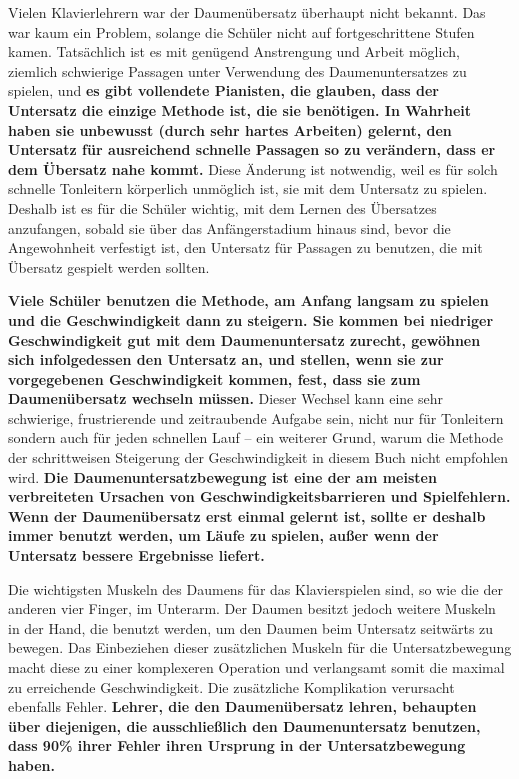 Vielen Klavierlehrern war der Daumenübersatz überhaupt nicht bekannt.
Das war kaum ein Problem, solange die Schüler nicht auf fortgeschrittene Stufen kamen.
Tatsächlich ist es mit genügend Anstrengung und Arbeit möglich, ziemlich schwierige Passagen unter Verwendung des Daumenuntersatzes zu spielen, und \textbf{es gibt vollendete Pianisten, die glauben, dass der Untersatz die einzige Methode ist, die sie benötigen.
In Wahrheit haben sie unbewusst (durch sehr hartes Arbeiten) gelernt, den Untersatz für ausreichend schnelle Passagen so zu verändern, dass er  dem Übersatz nahe kommt.}
Diese Änderung ist notwendig, weil es für solch schnelle Tonleitern körperlich unmöglich ist, sie mit dem Untersatz zu spielen.
Deshalb ist es für die Schüler wichtig, mit dem Lernen des Übersatzes anzufangen, sobald sie über das Anfängerstadium hinaus sind, bevor die Angewohnheit verfestigt ist, den Untersatz für Passagen zu benutzen, die mit Übersatz gespielt werden sollten.

\textbf{Viele Schüler benutzen die Methode, am Anfang langsam zu spielen und die Geschwindigkeit dann zu steigern.
Sie kommen bei niedriger Geschwindigkeit gut mit dem Daumenuntersatz zurecht, gewöhnen sich infolgedessen den Untersatz an, und stellen, wenn sie zur vorgegebenen Geschwindigkeit kommen, fest, dass sie zum Daumenübersatz wechseln müssen.}
Dieser Wechsel kann eine sehr schwierige, frustrierende und zeitraubende Aufgabe sein, nicht nur für Tonleitern sondern auch für jeden schnellen Lauf -- ein weiterer Grund, warum die Methode der schrittweisen Steigerung der Geschwindigkeit in diesem Buch nicht empfohlen wird.
\textbf{Die Daumenuntersatzbewegung ist eine der am meisten verbreiteten Ursachen von Geschwindigkeitsbarrieren und Spielfehlern.
Wenn der Daumenübersatz erst einmal gelernt ist, sollte er deshalb immer benutzt werden, um Läufe zu spielen, außer wenn der Untersatz bessere Ergebnisse liefert.}

Die wichtigsten Muskeln des Daumens für das Klavierspielen sind, so wie die der anderen vier Finger, im Unterarm.
Der Daumen besitzt jedoch weitere Muskeln in der Hand, die benutzt werden, um den Daumen beim Untersatz seitwärts zu bewegen.
Das Einbeziehen dieser zusätzlichen Muskeln für die Untersatzbewegung macht diese zu einer komplexeren Operation und verlangsamt somit die maximal zu erreichende Geschwindigkeit.
Die zusätzliche Komplikation verursacht ebenfalls Fehler.
\textbf{Lehrer, die den Daumenübersatz lehren, behaupten über diejenigen, die ausschließlich den Daumenuntersatz benutzen, dass 90\% ihrer Fehler ihren Ursprung in der Untersatzbewegung haben.}

